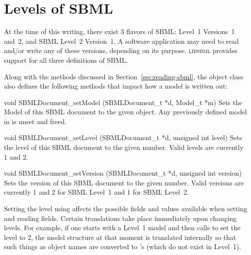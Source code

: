 \documentclass{sbmlmanual}
\newcommand{\libsbml}{\textsc{libsbml}}
\begin{document}
\section{Levels of SBML}
\label{sec:sbml-levels}

At the time of this writing, there exist 3 flavors of SBML: Level~1
Versions~1 and~2, and SBML Level~2 Version~1.  A software application may
need to read and/or write any of these versions, depending on its purpose.
\libsbml{} provides support for all three definitions of SBML.

Along with the methods discussed in Section~\ref{sec:reading-sbml}, the
 object class also defines the following methods
that impact how a model is written out:


\begin{methoddef}{void SBMLDocument\_setModel (SBMLDocument\_t *d, Model\_t *m)}
  Sets the Model of this SBML document to the given  object.
  Any previously defined model in  is unset and freed.
\end{methoddef}


\begin{methoddef}{void SBMLDocument\_setLevel (SBMLDocument\_t *d, unsigned int level)}
  Sets the level of this SBML document to the given 
  number.  Valid levels are currently 1 and 2.
\end{methoddef}


\begin{methoddef}{void SBMLDocument\_setVersion (SBMLDocument\_t *d, unsigned int version)}
  Sets the version of this SBML document to the given 
  number.  Valid versions are currently 1 and 2 for SBML Level~1 and 1 for SBML
  Level~2.
\end{methoddef}


Setting the level using  affects the
possible fields and values available when setting and reading fields.
Certain translations take place immediately upon changing levels.  For
example, if one starts with a Level~1 model and then calls
 to set the level to 2, the model
structure at that moment is translated internally so that such things as
object names are converted to 's (which do not exist in
Level~1).
\end{document}
